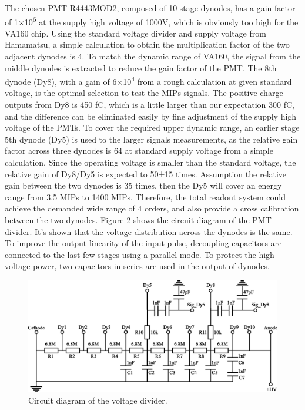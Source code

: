 \documentclass[5p, times]{elsarticle}
\begin{document}
The chosen PMT R4443MOD2, composed of 10 stage dynodes, has a gain factor of 1×10\textsuperscript{6} at the supply high
voltage of 1000V, which is obviously too high for the VA160 chip. Using the standard voltage divider and supply voltage
from Hamamatsu, a simple calculation to obtain the multiplication factor of the two adjacent dynodes is 4. To match the
dynamic range of VA160, the signal from the middle dynodes is extracted to reduce the gain factor of the PMT. The 8th
dynode (Dy8), with a gain of 6×10\textsuperscript{4} from a rough calculation at given standard voltage, is the optimal
selection to test the MIPs signals. The positive charge outputs from Dy8 is 450 fC, which is a little larger than our
expectation 300 fC, and the difference can be eliminated easily by fine adjustment of the supply high voltage of the
PMTs. To cover the required upper dynamic range, an earlier stage 5th dynode (Dy5) is used to the larger signals
measurements, as the relative gain factor across three dynodes is 64 at standard supply voltage from a simple
calculation. Since the operating voltage is smaller than the standard voltage, the relative gain of Dy8/Dy5 is expected
to 50±15 times. Assumption the relative gain between the two dynodes is 35 times, then the Dy5 will cover an energy
range from 3.5 MIPs to 1400 MIPs. Therefore, the total readout system could achieve the demanded wide range of 4
orders, and also provide a cross calibration between the two dynodes. Figure 2 shows the circuit diagram of the PMT
divider. It’s shown that the voltage distribution across the dynodes is the same. To improve the output linearity of
the input pulse, decoupling capacitors are connected to the last few stages using a parallel mode. To protect the high
voltage power, two capacitors in series are used in the output of dynodes.

\begin{figure}
\centering
 \includegraphics[width=140mm]{divider}
\caption{Circuit diagram of the voltage divider.}
\label{fig:divider}
\end{figure} 
\end{document}
